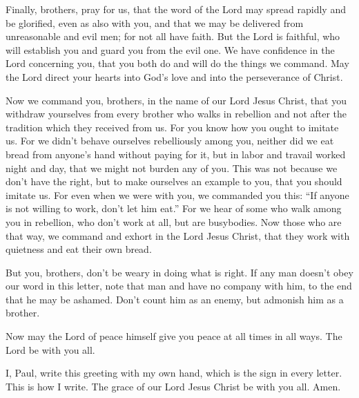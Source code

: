  Finally, brothers, pray for us, that the word of the Lord
may spread rapidly and be glorified, even as also with you, 
and that we may be delivered from unreasonable and evil men; for not all
have faith.  But the Lord is faithful, who will establish
you and guard you from the evil one.  We have confidence in
the Lord concerning you, that you both do and will do the things we
command.  May the Lord direct your hearts into God's love
and into the perseverance of Christ.

 Now we command you, brothers, in the name of our Lord Jesus
Christ, that you withdraw yourselves from every brother who walks in
rebellion and not after the tradition which they received from us.
 For you know how you ought to imitate us. For we didn't
behave ourselves rebelliously among you,  neither did we eat
bread from anyone's hand without paying for it, but in labor and travail
worked night and day, that we might not burden any of you. 
This was not because we don't have the right, but to make ourselves an
example to you, that you should imitate us.  For even when
we were with you, we commanded you this: ``If anyone is not willing to
work, don't let him eat.''  For we hear of some who walk
among you in rebellion, who don't work at all, but are busybodies.
 Now those who are that way, we command and exhort in the
Lord Jesus Christ, that they work with quietness and eat their own
bread.

 But you, brothers, don't be weary in doing what is right.
 If any man doesn't obey our word in this letter, note that
man and have no company with him, to the end that he may be ashamed.
 Don't count him as an enemy, but admonish him as a
brother.

 Now may the Lord of peace himself give you peace at all
times in all ways. The Lord be with you all.

 I, Paul, write this greeting with my own hand, which is
the sign in every letter. This is how I write.  The grace
of our Lord Jesus Christ be with you all. Amen.
